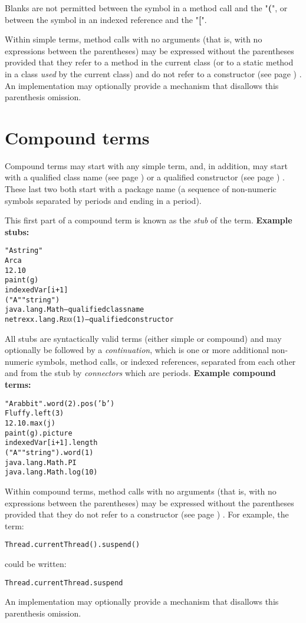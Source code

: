 Blanks are not permitted between the symbol in a method call and the
"\textbf{(}", or between the symbol in an indexed reference and
the "\textbf{[}".
 
Within simple terms, method calls with no arguments (that is, with no
expressions between the parentheses) may be expressed without the
parentheses provided that they refer to a method in the current class
(or to a static method in a class \emph{used} by the current class)
and do not refer to a  constructor (see page \pageref{refcons}) .
An implementation may optionally provide a mechanism that disallows this
parenthesis omission.
\section{Compound terms}\label{refcomterm}
 
Compound terms may start with any simple term, and, in addition, may
start with a  qualified class name (see page \pageref{refpackage})  or a
 qualified constructor (see page \pageref{refmethcon}) .
These last two both start with a package name (a sequence of non-numeric
symbols separated by periods and ending in a period).
 
This first part of a compound term is known as the \emph{stub} of the
term.
 \textbf{Example stubs:}
\begin{alltt}
"A string"
Arca
12.10
paint(g)
indexedVar[i+1]
("A" "string")
java.lang.Math        -- qualified class name
netrexx.lang.R\textsc{exx}(1)  -- qualified constructor
\end{alltt}
 
All stubs are syntactically valid terms (either simple or compound) and
may optionally be followed by a \emph{continuation}, which is one or
more additional non-numeric symbols, method calls, or indexed
references, separated from each other and from the stub by
\emph{connectors} which are periods.
 \textbf{Example compound terms:}
\begin{alltt}
"A rabbit".word(2).pos('b')
Fluffy.left(3)
12.10.max(j)
paint(g).picture
indexedVar[i+1].length
("A" "string").word(1)
java.lang.Math.PI
java.lang.Math.log(10)
\end{alltt}
 
Within compound terms, method calls with no arguments (that is, with no
expressions between the parentheses) may be expressed without the
parentheses provided that they do not refer to a
 constructor (see page \pageref{refcons}) .
For example, the term:
\begin{alltt}
Thread.currentThread().suspend()
\end{alltt}
could be written:
\begin{alltt}
Thread.currentThread.suspend
\end{alltt}
An implementation may optionally provide a mechanism that disallows this
parenthesis omission.
